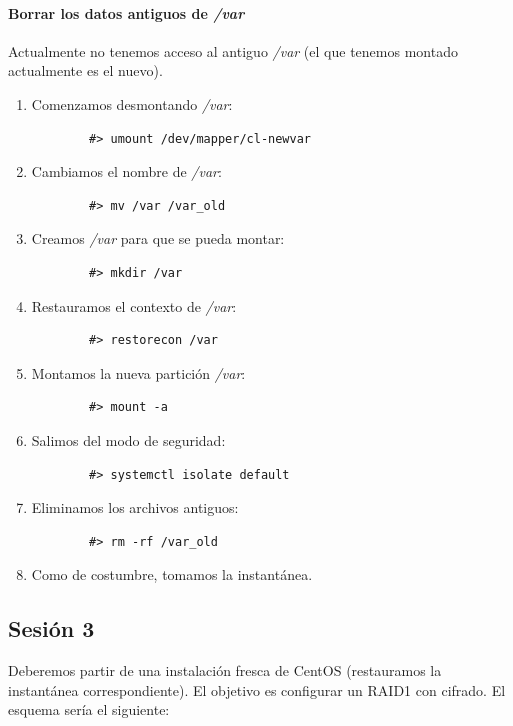 \documentclass[12pt,spanish]{article}
\begin{document}
\paragraph{Borrar los datos antiguos de \textit{/var}}
Actualmente no tenemos acceso al antiguo \textit{/var} (el que tenemos montado actualmente es el nuevo).
\begin{enumerate}
	\item Comenzamos desmontando \textit{/var}:
	\begin{lstlisting}
		#> umount /dev/mapper/cl-newvar
	\end{lstlisting}
	\item Cambiamos el nombre de \textit{/var}:
	\begin{lstlisting}
		#> mv /var /var_old
	\end{lstlisting}
	\item Creamos \textit{/var} para que se pueda montar:
	\begin{lstlisting}
		#> mkdir /var
	\end{lstlisting}
	\item Restauramos el contexto de \textit{/var}:
	\begin{lstlisting}
		#> restorecon /var
	\end{lstlisting}
	\item Montamos la nueva partición \textit{/var}:
	\begin{lstlisting}
		#> mount -a
	\end{lstlisting}
	\item Salimos del modo de seguridad:
	\begin{lstlisting}
		#> systemctl isolate default
	\end{lstlisting}
	\item Eliminamos los archivos antiguos:
	\begin{lstlisting}
		#> rm -rf /var_old
	\end{lstlisting}
	\item Como de costumbre, tomamos la instantánea.
\end{enumerate}


\subsection{Sesión 3}

Deberemos partir de una instalación fresca de CentOS (restauramos la instantánea correspondiente). El objetivo es configurar un RAID1 con cifrado. El esquema sería el siguiente:
\end{document}
